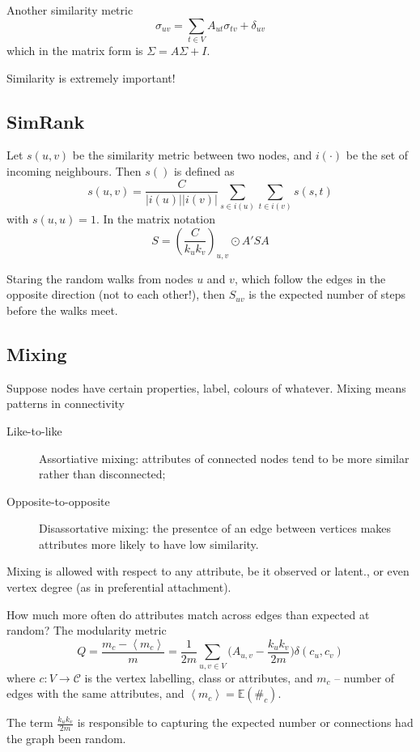 \documentclass[a4paper]{article}
\newcommand{\brac}[1]{{\left ( #1 \right )}}
\newcommand{\abs}[1]{{\left | #1 \right |}}
\newcommand{\brkt}[1]{{\left\langle #1 \right\rangle}}
\newcommand{\Ex}{\mathbb{E}}
\begin{document}
Another similarity metric
\[\sigma_{uv} = \sum_{t\in V} A_{ut}\sigma_{tv} + \delta_{uv}\]
which in the matrix form is $\Sigma = A \Sigma + I$.

Similarity is extremely important!

\subsection{SimRank} %
\label{sub:simrank}
Let $s(u,v)$ be the similarity metric between two nodes, and $i(\cdot)$ be the set of incoming neighbours. Then $s()$ is defined as 
\[ s(u,v) = \frac{C}{\abs{i(u)}\abs{i(v)}} \sum_{s\in i(u)} \sum_{t\in i(v)} s(s,t)\]
with $s(u,u)=1$. In the matrix notation
\[ S = \brac{\frac{C}{k_u k_v}}_{u,v}\odot A' S A\]

Staring the random walks from nodes $u$ and $v$, which follow the edges in the opposite direction (not to each other!), then $S_{uv}$ is the expected number of steps before the walks meet.


\subsection{Mixing} %
\label{sub:mixing}

Suppose nodes have certain properties, label, colours of whatever.
Mixing means patterns in connectivity
\begin{description}
	\item[Like-to-like] Assortiative mixing: attributes of connected nodes tend to be more similar rather than disconnected;
	\item[Opposite-to-opposite] Disassortative mixing: the presentce of an edge between vertices makes attributes more likely to have low similarity.
\end{description}

Mixing is allowed with respect to any attribute, be it observed or latent., or even vertex degree (as in preferential attachment).

How much more often do attributes match across edges than expected at random? The modularity metric
\[ Q = \frac{m_c-\brkt{m_c}}{m} = \frac{1}{2m}\sum_{u,v\in V} \Big( A_{u,v} - \frac{k_u k_v}{2m} \Big) \delta(c_u,c_v)\]
where $c:V\to \mathcal{C}$ is the vertex labelling, class or attributes, and $m_c$ -- number of edges with the same attributes, and $\brkt{m_c} =\Ex(\#_c)$.

The term $\frac{k_u k_v}{2m}$ is responsible to capturing the expected number or connections had the graph been random.
\end{document}
